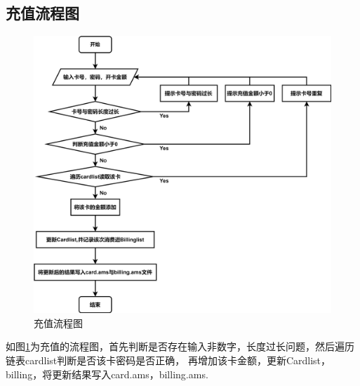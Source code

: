 \documentclass{article}
\begin{document}
    \subsection{充值流程图}
    \begin{figure}[h]
        \centering
        \includegraphics[scale=0.125]{figure/addmoney_pic.png}
        \caption{充值流程图}
        \label{addmoney_pic}
    \end{figure}
    如图\ref{addmoney_pic}为充值的流程图，首先判断是否存在输入非数字，长度过长问题，然后遍历链表cardlist判断是否该卡密码是否正确，
    再增加该卡金额，更新Cardlist，billing，将更新结果写入card.ams，billing.ams.
    \newpage
\end{document}
